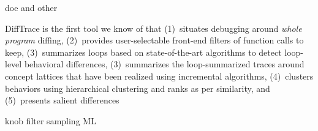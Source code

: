doe and other

DiffTrace is the first tool we know of that (1)~situates debugging around {\em whole program}
diffing, (2)~provides user-selectable front-end filters of function calls to keep,
(3)~summarizes loops based on state-of-the-art algorithms to detect loop-level
behavioral differences,
(3)~summarizes the loop-summarized
traces around concept lattices that have been realized using incremental
algorithms, (4)~clusters behaviors using hierarchical clustering and ranks as per similarity,
and (5)~presents salient differences 

knob filter
sampling
ML
 
